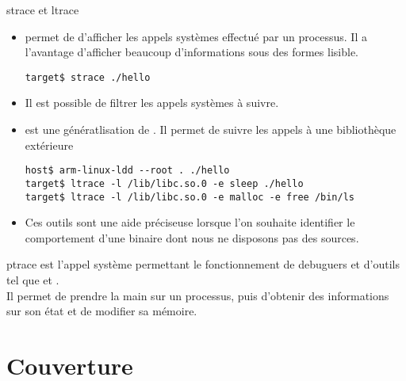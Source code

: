 \begin{frame}[fragile=singleslide]{strace et ltrace}
  \begin{itemize}
  \item {} permet de d'afficher les appels systèmes effectué
    par   un   processus.   Il   a  l'avantage   d'afficher   beaucoup
    d'informations sous des formes lisible.
    \begin{lstlisting}
target$ strace ./hello
    \end{lstlisting}
  \item Il est possible de filtrer les appels systèmes à suivre.
  \item  {}  est  une  génératlisation de  .  Il
    permet de suivre les appels à une bibliothèque extérieure
    \begin{lstlisting}
host$ arm-linux-ldd --root . ./hello
target$ ltrace -l /lib/libc.so.0 -e sleep ./hello
target$ ltrace -l /lib/libc.so.0 -e malloc -e free /bin/ls
    \end{lstlisting}
  \item  Ces outils  sont une  aide préciseuse  lorsque  l'on souhaite
    identifier le  comportement d'une  binaire dont nous  ne disposons
    pas des sources.
  \end{itemize}
\end{frame}

\begin{frame}[fragile=singleslide]{ptrace}
    est l'appel  système permettant  le  fonctionnement de
  debuguers et d'outils tel que  et .
  \\[2ex]
  Il permet  de prendre la main  sur un processus,  puis d'obtenir des
  informations sur son état et de modifier sa mémoire.
\end{frame}

\section{Couverture}


